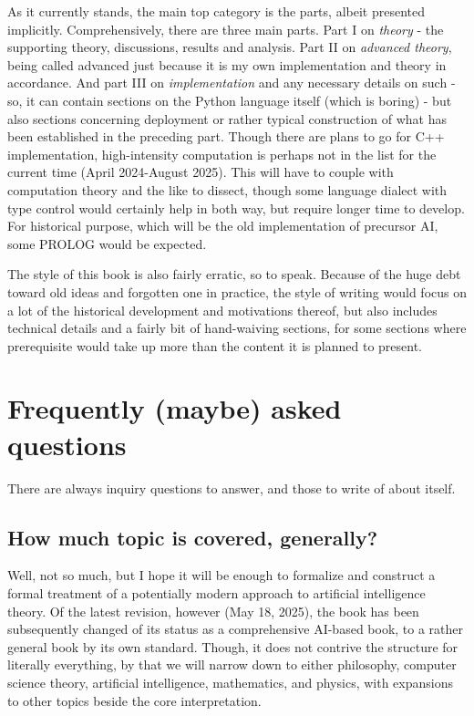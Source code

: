 As it currently stands, the main top category is the parts, albeit presented implicitly. Comprehensively, there are three main parts. Part I on \textit{theory} - the supporting theory, discussions, results and analysis. Part II on \textit{advanced theory}, being called advanced just because it is my own implementation and theory in accordance. And part III on \textit{implementation} and any necessary details on such - so, it can contain sections on the Python language itself (which is boring) - but also sections concerning deployment or rather typical construction of what has been established in the preceding part. Though there are plans to go for C++ implementation, high-intensity computation is perhaps not in the list for the current time (April 2024-August 2025). This will have to couple with computation theory and the like to dissect, though some language dialect with type control would certainly help in both way, but require longer time to develop. For historical purpose, which will be the old implementation of precursor AI, some PROLOG would be expected. 

The style of this book is also fairly erratic, so to speak. Because of the huge debt toward old ideas and forgotten one in practice, the style of writing would focus on a lot of the historical development and motivations thereof, but also includes technical details and a fairly bit of hand-waiving sections, for some sections where prerequisite would take up more than the content it is planned to present. 
\section{Frequently (maybe) asked questions}
There are always inquiry questions to answer, and those to write of about itself. 

\subsection{How much topic is covered, generally?}
Well, not so much, but I hope it will be enough to formalize and construct a formal treatment of a potentially modern approach to artificial intelligence theory. Of the latest revision, however (May 18, 2025), the book has been subsequently changed of its status as a comprehensive AI-based book, to a rather general book by its own standard. Though, it does not contrive the structure for literally everything, by that we will narrow down to either philosophy, computer science theory, artificial intelligence, mathematics, and physics, with expansions to other topics beside the core interpretation.
